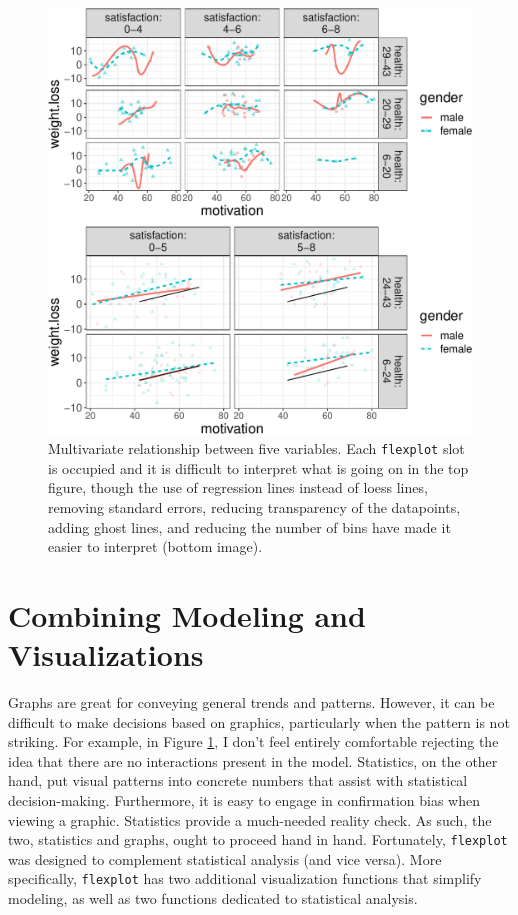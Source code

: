 \documentclass[
  man]{apa6}
\begin{document}
\begin{figure}
\centering
\includegraphics{flexplot_psychmeth_files/figure-latex/threeway-1.pdf}
\caption{\label{fig:threeway}Multivariate relationship between five variables. Each \texttt{flexplot} slot is occupied and it is difficult to interpret what is going on in the top figure, though the use of regression lines instead of loess lines, removing standard errors, reducing transparency of the datapoints, adding ghost lines, and reducing the number of bins have made it easier to interpret (bottom image). \label{fig:threeway}}
\end{figure}

\normalsize

\hypertarget{combining-modeling-and-visualizations}{%
\section{Combining Modeling and Visualizations}\label{combining-modeling-and-visualizations}}

Graphs are great for conveying general trends and patterns. However, it can be difficult to make decisions based on graphics, particularly when the pattern is not striking. For example, in Figure \ref{fig:threeway}, I don't feel entirely comfortable rejecting the idea that there are no interactions present in the model. Statistics, on the other hand, put visual patterns into concrete numbers that assist with statistical decision-making. Furthermore, it is easy to engage in confirmation bias when viewing a graphic. Statistics provide a much-needed reality check. As such, the two, statistics and graphs, ought to proceed hand in hand. Fortunately, \texttt{flexplot} was designed to complement statistical analysis (and vice versa). More specifically, \texttt{flexplot} has two additional visualization functions that simplify modeling, as well as two functions dedicated to statistical analysis.
\end{document}
